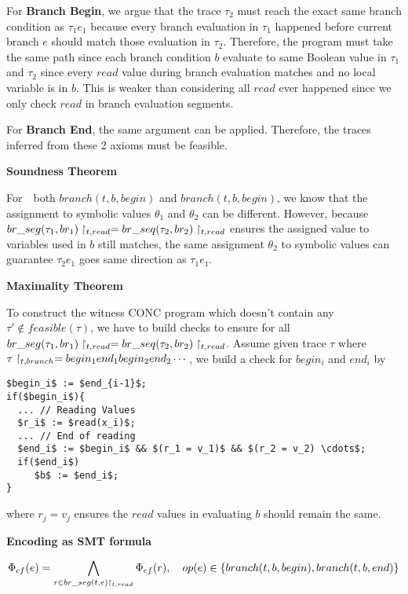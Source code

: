 \documentclass{article}
\begin{document}
\begin{enumerate}
For \textbf{Branch Begin}, we argue that the trace $\tau_2$ must reach
the exact same branch condition as $\tau_1 e_1$ because every branch evaluation
in $\tau_1$ happened before current branch $e$ should match those evaluation in $\tau_2$.
Therefore, the program must take the same path since each branch condition $b$ 
evaluate to same Boolean value in $\tau_1$ and $\tau_2$ since every $read$ value during
branch evaluation matches and no local variable is in $b$.
This is weaker than considering all $read$ ever happened since we only check $read$ in
branch evaluation segments.
 
For \textbf{Branch End}, the same argument can be applied.
Therefore, the traces inferred from these 2 axioms must be feasible.

\textbf{Soundness Theorem}

For　both $branch(t, b, begin)$ and $branch(t, b, begin)$,
we know that the assignment to symbolic values $\theta_1$ and $\theta_2$
can be different.
However, because $br\_seg(\tau_1, br_1)\upharpoonright_{t,read} = br\_seq(\tau_2, br_2)\upharpoonright_{t,read}$
ensures the assigned value to variables used in $b$ still matches,
the same assignment $\theta_2$ to symbolic values can guarantee $\tau_2 e_1$
goes same direction as $\tau_1 e_1$.

\textbf{Maximality Theorem}

To construct the witness CONC program which doesn't contain any 
$\tau' \notin feasible(\tau)$,
we have to build checks to ensure for all
$br\_seg(\tau_1, br_1)\upharpoonright_{t,read} = br\_seq(\tau_2, br_2)\upharpoonright_{t,read}$.
Assume given trace $\tau$ where $\tau \upharpoonright_{t, branch} = begin_1end_1begin_2end_2\cdots$,
we build a check for $begin_i$ and $end_i$ by
\begin{lstlisting}
$begin_i$ := $end_{i-1}$;
if($begin_i$){
  ... // Reading Values
  $r_i$ := $read(x_i)$;
  ... // End of reading
  $end_i$ := $begin_i$ && $(r_1 = v_1)$ && $(r_2 = v_2) \cdots$;
  if($end_i$)
     $b$ := $end_i$;
}
\end{lstlisting}
where $r_j = v_j$ ensures the $read$ values in evaluating $b$ should remain the same.

\textbf{Encoding as SMT formula}

$$
\Phi_{cf}(e) = \bigwedge_{r \in br\_seg(t, e) \upharpoonright_{t, read}} \Phi_{cf}(r),
\quad op(e) \in \{branch(t, b, begin), branch(t, b, end)\}
$$

\end{enumerate}
\end{document}

